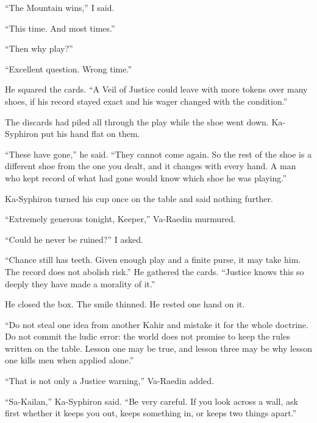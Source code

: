 ``The Mountain wins,'' I said.\par

``This time. And most times.''\par

``Then why play?''\par

``Excellent question. Wrong time.''\par

He squared the cards. ``A Veil of Justice could leave with more tokens over many shoes, if his record stayed exact and his wager changed with the condition.''\par

The discards had piled all through the play while the shoe went down. Ka-Syphiron put his hand flat on them.\par

``These have gone,'' he said. ``They cannot come again. So the rest of the shoe is a different shoe from the one you dealt, and it changes with every hand. A man who kept record of what had gone would know which shoe he was playing.''\par

Ka-Syphiron turned his cup once on the table and said nothing further.\par

``Extremely generous tonight, Keeper,'' Va-Raedin murmured.\par

``Could he never be ruined?'' I asked.\par

``Chance still has teeth. Given enough play and a finite purse, it may take him. The record does not abolish risk.'' He gathered the cards. ``Justice knows this so deeply they have made a morality of it.''\par

He closed the box. The smile thinned. He rested one hand on it.\par

``Do not steal one idea from another Kahir and mistake it for the whole doctrine. Do not commit the ludic error: the world does not promise to keep the rules written on the table. Lesson one may be true, and lesson three may be why lesson one kills men when applied alone.''\par

``That is not only a Justice warning,'' Va-Raedin added.\par

``Sa-Kailan,'' Ka-Syphiron said. ``Be very careful. If you look across a wall, ask first whether it keeps you out, keeps something in, or keeps two things apart.''\par

